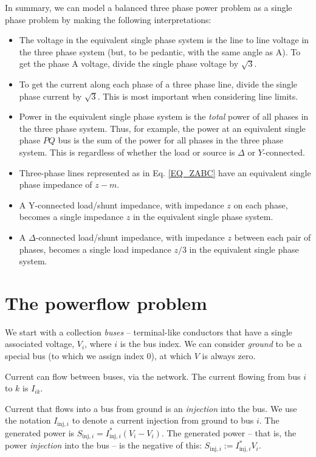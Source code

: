 \documentclass[11pt]{article}
\begin{document}
In summary, we can model a balanced three phase power problem as a single phase problem by making the following interpretations:
\begin{itemize}
	\item The voltage in the equivalent single phase system is the line to line voltage in the three phase system (but, to be pedantic, with the same angle as A). To get the phase A voltage, divide the single phase voltage by $\sqrt{3}$.
	\item To get the current along each phase of a three phase line, divide the single phase current by $\sqrt{3}$. This is most important when considering line limits.
	\item Power in the equivalent single phase system is the \emph{total} power of all phases in the three phase system. Thus, for example, the power at an equivalent single phase $PQ$ bus is the sum of the power for all phases in the three phase system. This is regardless of whether the load or source is $\Delta$ or $Y$-connected.
	\item Three-phase lines represented as in Eq. \ref{EQ_ZABC} have an equivalent single phase impedance of $z - m$.
	\item A Y-connected load/shunt impedance, with impedance $z$ on each phase, becomes a single impedance $z$ in the equivalent single phase system.
	\item A $\Delta$-connected load/shunt impedance, with impedance $z$ between each pair of phases, becomes a single load impedance $z/3$ in the equivalent single phase system.
	
\end{itemize}

\section{The powerflow problem}

We start with a collection \emph{buses} -- terminal-like conductors that have a single associated voltage, $V_i$, where $i$ is the bus index. We can consider \emph{ground} to be a special bus (to which we assign index 0), at which $V$ is always zero.

Current can flow between buses, via the network. The current flowing from bus $i$ to $k$ is $I_{ik}$. 

Current that flows into a bus from ground is an \emph{injection} into the bus. We use the notation $I_{\text{inj},i}$ to denote a current injection from ground to bus $i$. The generated power is $S_{\text{inj}, i} = I_{\text{inj}, i}^*(V_i - V_i)$. The generated power -- that is, the power \emph{injection} into the bus -- is the negative of this: $S_{\text{inj},i} := I_{\text{inj},i}^*V_i$.
\end{document}
